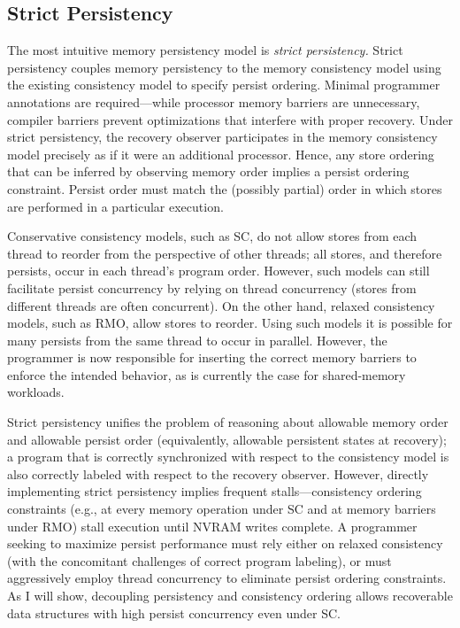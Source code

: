 \subsection{Strict Persistency}

The most intuitive memory persistency model is \emph{strict persistency.}
Strict persistency couples memory persistency to the memory consistency model using the existing consistency model to specify persist ordering.
Minimal programmer annotations are required---while processor memory barriers are unnecessary, compiler barriers prevent optimizations that interfere with proper recovery.
Under strict persistency, the recovery observer participates in the memory consistency model precisely as if it were an additional processor.  
Hence, any store ordering that can be inferred by observing memory order implies a persist ordering constraint.
Persist order must match the (possibly partial) order in which stores are performed in a particular execution.
 
Conservative consistency models, such as SC, do not allow stores from each thread to reorder from the perspective of other threads; all stores, and therefore persists, occur in each thread's program order.
However, such models can still facilitate persist concurrency by relying on thread concurrency (stores from different threads are often concurrent).
On the other hand, relaxed consistency models, such as RMO, allow stores to reorder.
Using such models it is possible for many persists from the same thread to occur in parallel.
However, the programmer is now responsible for inserting the correct memory barriers to enforce the intended behavior, as is currently the case for shared-memory workloads.

Strict persistency unifies the problem of reasoning about allowable memory order and allowable persist order (equivalently, allowable persistent states at recovery); a program that is correctly synchronized with respect to the consistency model is also correctly labeled with respect to the recovery observer.
However, directly implementing strict persistency implies frequent stalls---consistency ordering constraints (e.g., at every memory operation under SC and at memory barriers under RMO) stall execution until NVRAM writes complete. 
A programmer seeking to maximize persist performance must rely either on relaxed consistency (with the concomitant challenges of correct program labeling), or must aggressively employ thread concurrency to eliminate persist ordering constraints.
As I will show, decoupling persistency and consistency ordering allows recoverable data structures with high persist concurrency even under SC.

